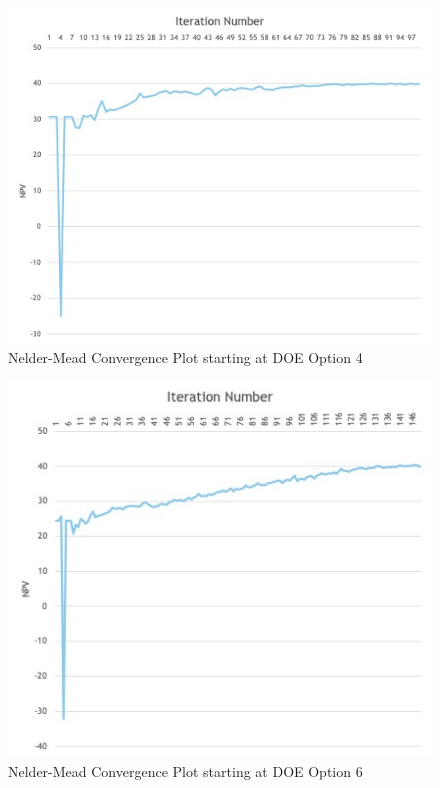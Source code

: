 \documentclass[balance,upint,subscriptcorrection,varvw,mathalfa=cal=boondoxo,spanish,french,vietnamese,russian,greek,pdf-a,colorlinks]{asmeconf}
\begin{document}


\begin{figure}
\centering\includegraphics[width=0.7\linewidth]{images/nelder_option4.jpg}
\caption{Nelder-Mead Convergence Plot starting at DOE Option 4}\label{nelder_option4:1}
\end{figure}
 



\begin{figure}
\centering\includegraphics[width=0.7\linewidth]{images/nelder_option6.jpg}
\caption{Nelder-Mead Convergence Plot starting at DOE Option 6}\label{nelder_option6:1}
\end{figure}
 
\end{document}
